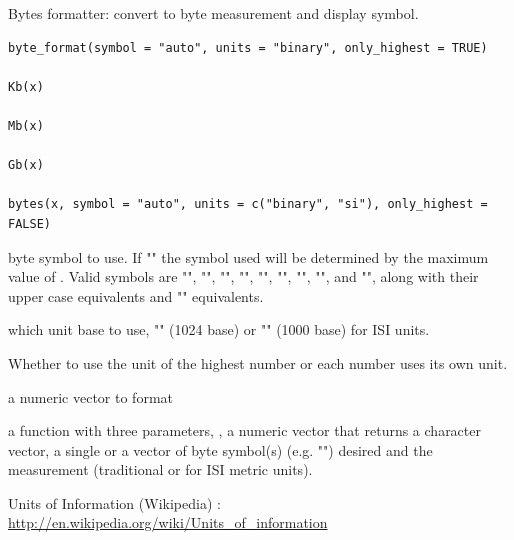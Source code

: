 \documentclass[a4paper]{book}
\begin{document}
%
\begin{Description}
Bytes formatter: convert to byte measurement and display symbol.
\end{Description}
%
\begin{Usage}
\begin{verbatim}
byte_format(symbol = "auto", units = "binary", only_highest = TRUE)

Kb(x)

Mb(x)

Gb(x)

bytes(x, symbol = "auto", units = c("binary", "si"), only_highest = FALSE)
\end{verbatim}
\end{Usage}
%
\begin{Arguments}
\begin{ldescription}
\item[\code{symbol}] byte symbol to use. If "" the symbol used will be
determined by the maximum value of . Valid symbols are
"", "", "", "", "", "",
"", "", and "", along with their upper case
equivalents and "" equivalents.

\item[\code{units}] which unit base to use, "" (1024 base) or
"" (1000 base) for ISI units.

\item[\code{only\_highest}] Whether to use the unit of the highest number or
each number uses its own unit.

\item[\code{x}] a numeric vector to format
\end{ldescription}
\end{Arguments}
%
\begin{Value}
a function with three parameters, , a numeric vector that
returns a character vector,  a single or a vector of byte
symbol(s) (e.g. "") desired and the measurement 
(traditional  or  for ISI metric units).
\end{Value}
%
\begin{References}
Units of Information (Wikipedia) :
\url{http://en.wikipedia.org/wiki/Units_of_information}
\end{References}
\end{document}
